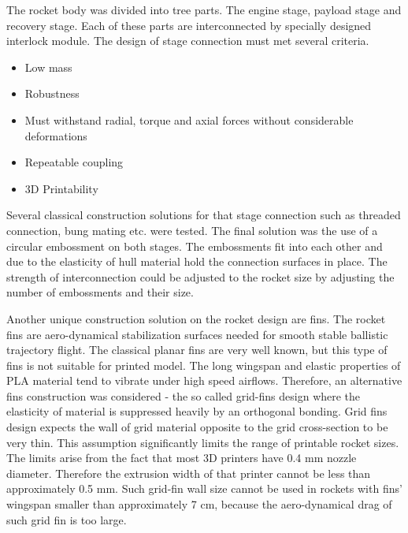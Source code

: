 \documentclass{poster16}
\begin{document}
The rocket body was divided into tree parts. The engine stage, payload stage and recovery stage. Each of these parts are interconnected by specially designed interlock module. The design of stage connection must met several criteria. 

\begin{itemize}
\item Low mass
\item Robustness
\item Must withstand radial, torque and axial forces without considerable deformations
\item Repeatable coupling 
\item 3D Printability
\end{itemize}

Several classical construction solutions for that stage connection such as threaded connection, bung mating etc. were tested.
The final solution was the use of a circular embossment on both stages. The embossments fit into each other and due to the elasticity of hull material hold the connection surfaces in place.  The strength of interconnection could be adjusted to the rocket size by adjusting the number of embossments and their size.

Another unique construction solution on the rocket design are fins. The rocket fins are aero-dynamical stabilization surfaces needed for smooth stable ballistic trajectory flight.  The classical planar fins are very well known, but this type of fins is not suitable for printed model.  The long wingspan and elastic properties of PLA material tend to vibrate under high speed airflows.
Therefore, an alternative fins construction was considered - the so called grid-fins design \cite{grid_fins} where the elasticity of material is suppressed heavily by an orthogonal bonding.
Grid fins design expects the wall of grid material opposite to the grid cross-section to be very thin. This assumption significantly limits the range of printable rocket sizes. The limits arise from the fact that most 3D printers have 0.4 mm nozzle diameter. Therefore the extrusion width of that printer cannot be less than approximately 0.5 mm. Such grid-fin wall size cannot be used in rockets with fins' wingspan smaller than approximately 7 cm, because the aero-dynamical drag of such grid fin is too large. 
\end{document}
